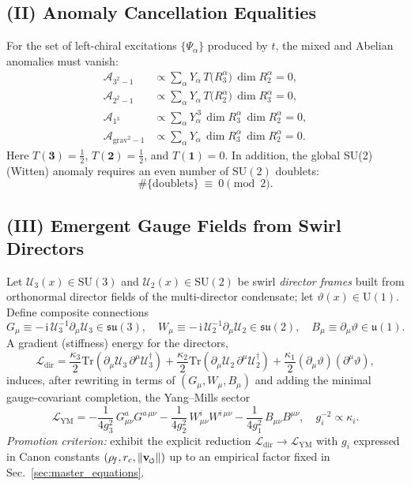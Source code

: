 \documentclass[11pt]{article}
\newcommand{\Tr}{\mathrm{Tr}}
\newcommand{\ii}{\mathrm{i}}
\newcommand{\swirlarrow}{%
     \mathchoice{\mkern-2mu\scriptstyle\boldsymbol{\circlearrowleft}}%
                {\mkern-2mu\scriptstyle\boldsymbol{\circlearrowleft}}%
                {\mkern-2mu\scriptscriptstyle\boldsymbol{\circlearrowleft}}%
                {\mkern-2mu\scriptscriptstyle\boldsymbol{\circlearrowleft}}%
}
\newcommand{\vswirl}{\mathbf{v}_{\swirlarrow}}
\begin{document}
\subsection*{(II) Anomaly Cancellation Equalities}
For the set of left-chiral excitations $\{\Psi_\alpha\}$ produced by $t$, the mixed and Abelian anomalies must vanish:
\begin{align}
	\mathcal A_{3^2-1} &\propto \sum_\alpha Y_\alpha\,T\!\big(R_3^\alpha\big)\,\dim R_2^\alpha = 0,\label{eq:A321}\\
	\mathcal A_{2^2-1} &\propto \sum_\alpha Y_\alpha\,T\!\big(R_2^\alpha\big)\,\dim R_3^\alpha = 0,\label{eq:A221}\\
	\mathcal A_{1^3} &\propto \sum_\alpha Y_\alpha^{\,3}\,\dim R_3^\alpha\,\dim R_2^\alpha = 0,\label{eq:A111}\\
	\mathcal A_{\mathrm{grav}^2-1} &\propto \sum_\alpha Y_\alpha\,\dim R_3^\alpha\,\dim R_2^\alpha = 0.\label{eq:Agrav}
\end{align}
Here $T(\mathbf 3)=\tfrac12$, $T(\mathbf 2)=\tfrac12$, and $T(\mathbf 1)=0$. In addition, the global SU(2) (Witten) anomaly requires an even number of $\mathrm{SU}(2)$ doublets:
\[
	\#\{\text{doublets}\}\ \equiv\ 0 \pmod 2.
\]

\subsection*{(III) Emergent Gauge Fields from Swirl Directors}
Let $\mathcal U_3(x)\in \mathrm{SU}(3)$ and $\mathcal U_2(x)\in \mathrm{SU}(2)$ be swirl \emph{director frames} built from orthonormal director fields of the multi-director condensate; let $\vartheta(x)\in \mathrm{U}(1)$. Define composite connections
\[
	G_\mu \equiv -\,\ii\,\mathcal U_3^{-1}\partial_\mu \mathcal U_3\in\mathfrak{su}(3),\quad
	W_\mu \equiv -\,\ii\,\mathcal U_2^{-1}\partial_\mu \mathcal U_2\in\mathfrak{su}(2),\quad
	B_\mu \equiv \partial_\mu \vartheta \in \mathfrak u(1).
\]
A gradient (stiffness) energy for the directors,
\[
	\mathcal L_{\text{dir}}=\frac{\kappa_3}{2}\Tr(\partial_\mu\mathcal U_3\,\partial^\mu\mathcal U_3^\dagger)
	+\frac{\kappa_2}{2}\Tr(\partial_\mu\mathcal U_2\,\partial^\mu\mathcal U_2^\dagger)
	+\frac{\kappa_1}{2}(\partial_\mu\vartheta)(\partial^\mu\vartheta),
\]
induces, after rewriting in terms of $(G_\mu,W_\mu,B_\mu)$ and adding the minimal gauge-covariant completion, the Yang–Mills sector
\[
	\mathcal L_{\text{YM}}=-\frac{1}{4 g_3^2}\,G_{\mu\nu}^a G^{a\,\mu\nu}
	-\frac{1}{4 g_2^2}\,W_{\mu\nu}^i W^{i\,\mu\nu}
	-\frac{1}{4 g_1^2}\,B_{\mu\nu}B^{\mu\nu},
	\quad
	g_i^{-2}\propto \kappa_i.
\]
\emph{Promotion criterion:} exhibit the explicit reduction $\mathcal L_{\text{dir}}\to\mathcal L_{\text{YM}}$ with $g_i$ expressed in Canon constants $(\rho_{\!f},r_c,\|\vswirl\|)$ up to an empirical factor fixed in Sec.~\ref{sec:master_equations}.
\end{document}
